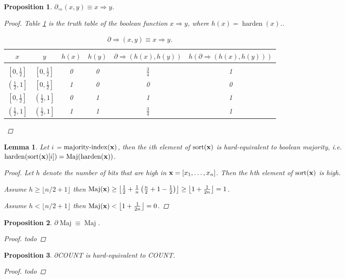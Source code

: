 \documentclass{article} %
\newtheorem{prop}{Proposition}
\newtheorem{lemma}{Lemma}
\begin{document}
\begin{prop}\label{prop:implies}
	$\partial_{\Rightarrow}\!(x,y) \equiv x \Rightarrow y$.
\begin{proof}
	Table \ref{implies-table} is the truth table of the boolean function $x \Rightarrow y$, where $h(x) = \operatorname{harden}(x)$..
	\begin{table}
	\begin{center}
		\begin{tabular}{cccccc}
			\multicolumn{1}{c}{$x$}  &\multicolumn{1}{c}{$y$}  &\multicolumn{1}{c}{$h(x)$}  &\multicolumn{1}{c}{$h(y)$} &\multicolumn{1}{c}{$\partial \Rightarrow(h(x), h(y))$} &\multicolumn{1}{c}{$h(\partial \Rightarrow(h(x), h(y)))$}
			\\ \hline \\
			$\left[0, \frac{1}{2}\right]$ & $\left[0, \frac{1}{2}\right]$ & 0 & 0 & $\frac{3}{4}$ & 1\\[0.1cm]
			$\left(\frac{1}{2}, 1\right]$ & $\left[0, \frac{1}{2}\right]$ &1 & 0 & 0 & 0\\[0.1cm]
			$\left[0, \frac{1}{2}\right]$ & $\left(\frac{1}{2}, 1\right]$ &0 & 1 & 1 & 1\\[0.1cm]
			$\left(\frac{1}{2}, 1\right]$ & $\left(\frac{1}{2}, 1\right]$ &1 & 1 & $\frac{3}{4}$ & 1\\[0.1cm]
		\end{tabular}
	\end{center}
	\caption{$\partial \Rightarrow(x,y) \equiv x \Rightarrow y$.}\label{implies-table}
	\end{table}			
\end{proof}
\end{prop}

\begin{lemma}
Let $i$ = $\operatorname{majority-index}({\bf x})$, then the $i$th element of $\operatorname{sort}({\bf x})$ is hard-equivalent to boolean majority, i.e. $\operatorname{harden}(\operatorname{sort}({\bf x})[i]) = \operatorname{Maj}(\operatorname{harden}({\bf x}))$.
\begin{proof}
Let $h$ denote the number of bits that are high in ${\bf x} = [x_{1}, \dots, x_{n}]$. Then the $h$th element of $\operatorname{sort}({\bf x})$ is high. 

Assume $h \geq \lfloor n/2 + 1 \rfloor$ then $\operatorname{Maj}({\bf x}) \geq \left\lfloor \frac{1}{2} + \frac{1}{n}\left(\frac{n}{2} + 1 - \frac{1}{2} \right) \right\rfloor
\geq \left\lfloor 1 + \frac{1}{2n} \right\rfloor = 1$. 

Assume $h < \lfloor n/2 + 1 \rfloor$ then $\operatorname{Maj}({\bf x}) < \left\lfloor 1 + \frac{1}{2n} \right\rfloor = 0$.
\end{proof}
\end{lemma}

\begin{prop}\label{prop:majority}
	$\partial\!\operatorname{Maj} \equiv \operatorname{Maj}$.
\begin{proof}
	todo
\end{proof}
\end{prop}

\begin{prop}\label{prop:count}
	$\partial${COUNT} is hard-equivalent to COUNT.
	\begin{proof}
		todo
	\end{proof}
\end{prop}
\end{document}

